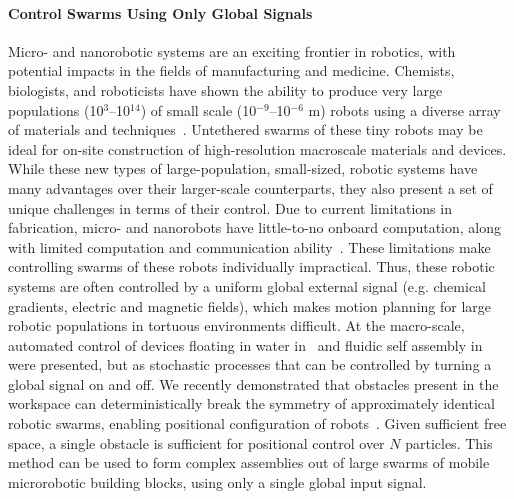 \paragraph{Control Swarms Using Only Global Signals}
 Micro- and nanorobotic systems are an exciting frontier in robotics, with potential impacts in the fields of manufacturing and medicine. 
Chemists, biologists, and roboticists have shown the ability to produce very large populations (10$^3$--10$^{14}$) of small scale (10$^{-9}$--10$^{-6}$ m) robots using a diverse array of materials and techniques~\cite{rubenstein2012kilobot,ou2013motion,chiang2011toward}. 
Untethered swarms of these tiny robots may be ideal for on-site construction of high-resolution macroscale materials and devices. 
While these new types of large-population, small-sized, robotic systems have many advantages over their larger-scale counterparts, they also present a set of unique challenges in terms of their control. 
Due to  current limitations in fabrication, micro- and nanorobots have little-to-no onboard computation, along with limited computation and communication ability~\cite{chiang2011toward, chowdhury2015controlling, donald2013planning}.  
These limitations make controlling swarms of these robots individually impractical. 
Thus, these robotic systems are often controlled by a uniform global external signal (e.g. chemical gradients, electric and magnetic fields), which makes motion planning for large robotic populations in tortuous environments difficult.
At the macro-scale, automated control of devices floating in water in~\cite{mermoud2012real} and fluidic self assembly in~\cite{mastrangeli2014automated} were presented, but as stochastic processes that can be controlled by turning a global signal on and off.
We recently demonstrated that obstacles present in the workspace can deterministically break the symmetry of approximately identical robotic swarms, enabling positional configuration of robots~\cite{becker2013massive}. 
 Given sufficient free space, a single obstacle is sufficient for positional control over $N$ particles.  
This method can be used to form complex assemblies out of large swarms of mobile microrobotic building blocks, using only a single global input signal.

